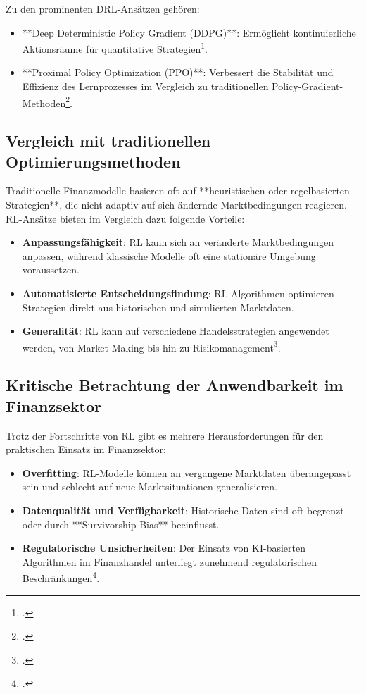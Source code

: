 Zu den prominenten DRL-Ansätzen gehören:
\begin{itemize}
	\item **Deep Deterministic Policy Gradient (DDPG)**: Ermöglicht kontinuierliche Aktionsräume für quantitative Strategien\footcite{Lillicrap2016}.
	\item **Proximal Policy Optimization (PPO)**: Verbessert die Stabilität und Effizienz des Lernprozesses im Vergleich zu traditionellen Policy-Gradient-Methoden\footcite{Schulman2017}.
\end{itemize}

\subsection{Vergleich mit traditionellen Optimierungsmethoden}
Traditionelle Finanzmodelle basieren oft auf **heuristischen oder regelbasierten Strategien**, die nicht adaptiv auf sich ändernde Marktbedingungen reagieren. RL-Ansätze bieten im Vergleich dazu folgende Vorteile:

\begin{itemize}
	\item \textbf{Anpassungsfähigkeit}: RL kann sich an veränderte Marktbedingungen anpassen, während klassische Modelle oft eine stationäre Umgebung voraussetzen.
	\item \textbf{Automatisierte Entscheidungsfindung}: RL-Algorithmen optimieren Strategien direkt aus historischen und simulierten Marktdaten.
	\item \textbf{Generalität}: RL kann auf verschiedene Handelsstrategien angewendet werden, von Market Making bis hin zu Risikomanagement\footcite{Fischer2018}.
\end{itemize}

\subsection{Kritische Betrachtung der Anwendbarkeit im Finanzsektor}
Trotz der Fortschritte von RL gibt es mehrere Herausforderungen für den praktischen Einsatz im Finanzsektor:

\begin{itemize}
	\item \textbf{Overfitting}: RL-Modelle können an vergangene Marktdaten überangepasst sein und schlecht auf neue Marktsituationen generalisieren.
	\item \textbf{Datenqualität und Verfügbarkeit}: Historische Daten sind oft begrenzt oder durch **Survivorship Bias** beeinflusst.
	\item \textbf{Regulatorische Unsicherheiten}: Der Einsatz von KI-basierten Algorithmen im Finanzhandel unterliegt zunehmend regulatorischen Beschränkungen\footcite{Alderman2021}.
\end{itemize}
